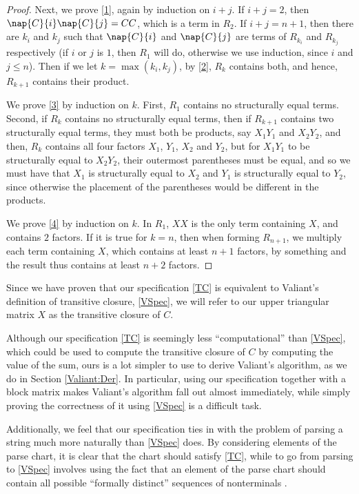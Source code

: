 \begin{proof}
Next, we prove \ref{1}, again by induction on $i + j$. If $i + j = 2$, then $\nap{C}{i}\nap{C}{j} = CC$, which is a term in $R_2$. If $i + j = n + 1$, then there are $k_i$ and $k_j$ such that $\nap{C}{i}$ and $\nap{C}{j}$ are terms of $R_{k_i}$ and $R_{k_j}$ respectively (if $i$ or $j$ is $1$, then $R_1$ will do, otherwise we use induction, since $i$ and $j \le n$). Then if we let $k = \max(k_i,k_j)$, by \ref{2}, $R_k$ contains both, and hence, $R_{k+1}$ contains their product. 

We prove \ref{3} by induction on $k$. First, $R_1$ contains no structurally equal terms. Second, if $R_k$ contains no structurally equal terms, then if $R_{k+1}$ contains two structurally equal terms, they must both be products, say $X_1Y_1$ and $X_2Y_2$, and then, $R_{k}$ contains all four factors $X_1$, $Y_1$, $X_2$ and $Y_2$, but for $X_1Y_1$ to be structurally equal to $X_2Y_2$, their outermost parentheses must be equal, and so we must have that $X_1$ is structurally equal to $X_2$ and $Y_1$ is structurally equal to $Y_2$, since otherwise the placement of the parentheses would be different in the products. 

We prove \ref{4} by induction on $k$. In $R_1$, $XX$ is the only term containing $X$, and contains $2$ factors. If it is true for $k = n$, then when forming $R_{n+1}$, we multiply each term containing $X$, which contains at least $n + 1$ factors, by something and the result thus contains at least $n+2$ factors.
\end{proof}

Since we have proven that our specification \eqref{TC} is equivalent to Valiant's definition of transitive closure, \eqref{VSpec}, we will refer to our upper triangular matrix $X$ as the transitive closure of $C$. 

Although our specification \eqref{TC} is seemingly less ``computational'' than 
\eqref{VSpec}, which could be used to compute the transitive closure of $C$ by computing the value of the sum, ours is a lot simpler to use to derive Valiant's algorithm, as we do in Section \ref{Valiant:Der}. In particular, using our specification together with a block matrix makes Valiant's algorithm fall out almost immediately, while simply proving the correctness of it using \eqref{VSpec} is a difficult task.

Additionally, we feel that our specification ties in with the problem of parsing a string much more naturally than \eqref{VSpec} does. By considering elements of the parse chart, it is clear that the chart should satisfy \eqref{TC}, while to go from parsing to \eqref{VSpec} involves using the fact that an element of the parse chart should contain all possible ``formally distinct'' sequences of nonterminals \citep{Valiant}.

